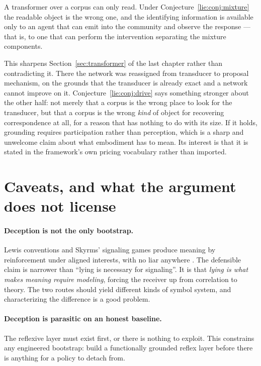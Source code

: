\begin{conjecture}
\label{lie:conj:drive}
A transformer over a corpus can only read. Under
Conjecture~\ref{lie:conj:mixture} the readable object is the wrong one, and the
identifying information is available only to an agent that can emit into the
community and observe the response --- that is, to one that can perform the
intervention separating the mixture components.
\end{conjecture}

This sharpens Section~\ref{sec:transformer} of the last chapter rather than
contradicting it. There the network was reassigned from transducer to proposal
mechanism, on the grounds that the transducer is already exact and a network
cannot improve on it. Conjecture~\ref{lie:conj:drive} says something stronger
about the other half: not merely that a corpus is the wrong place to look for the
transducer, but that a corpus is the wrong \emph{kind} of object for recovering
correspondence at all, for a reason that has nothing to do with its size. If it
holds, grounding requires participation rather than perception, which is a sharp
and unwelcome claim about what embodiment has to mean. Its interest is that it is
stated in the framework's own pricing vocabulary rather than imported.

\section{Caveats, and what the argument does not license}
\label{sec:lie-caveats}

\paragraph{Deception is not the only bootstrap.} Lewis conventions and Skyrms'
signaling games produce meaning by reinforcement under aligned interests, with no
liar anywhere \cite{lewis1969,skyrms2010}. The defensible claim is narrower than
``lying is necessary for signaling''. It is that \emph{lying is what makes
meaning require modeling}, forcing the receiver up from correlation to theory.
The two routes should yield different kinds of symbol system, and characterizing
the difference is a good problem.

\paragraph{Deception is parasitic on an honest baseline.} The reflexive layer
must exist first, or there is nothing to exploit. This constrains any engineered
bootstrap: build a functionally grounded reflex layer before there is anything
for a policy to detach from.

